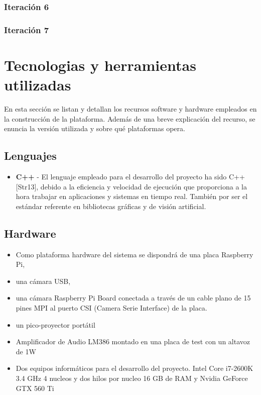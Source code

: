 \begin{description}
\begin{description}
\end{description}

\subsubsection{Iteración 6}
\subsubsection{Iteración 7}

\section{Tecnologias y herramientas utilizadas}

En esta sección se listan y detallan los recursos software y hardware empleados en la construcción de la plataforma. Además de una breve explicación del recurso, se enuncia la versión utilizada y sobre qué plataformas opera.

\subsection{Lenguajes}
\begin{itemize}
\item \textbf{C++} - El lenguaje empleado para el desarrollo del proyecto ha sido C++ [Str13], debido a la eficiencia y velocidad de ejecución que proporciona a la hora trabajar en aplicaciones y sistemas en tiempo real. También por ser el estándar referente en bibliotecas gráficas y de visión artificial.
\end{itemize}

\subsection{Hardware}
\begin{itemize}
\item Como plataforma hardware del sistema se dispondrá de una placa Raspberry Pi, 
\item una cámara USB, 
\item una cámara Raspberry Pi Board conectada a través de un cable plano de 15 pines MPI al puerto CSI (Camera Serie Interface) de la placa.
\item un pico-proyector portátil 
\item Amplificador de Audio LM386 montado en una placa de test con un altavoz de 1W
\item Dos equipos informáticos para el desarrollo del proyecto. Intel Core i7-2600K 3.4 GHz 4 nucleos y dos hilos por nucleo 16 GB de RAM y Nvidia GeForce GTX 560 Ti


\end{itemize}
\end{description}
